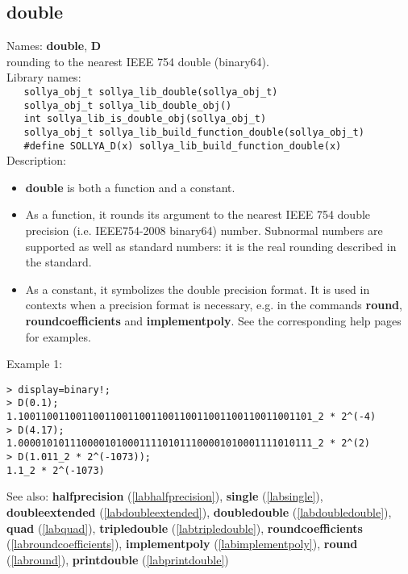\subsection{double}
\label{labdouble}
\noindent Names: \textbf{double}, \textbf{D}\\
\phantom{aaa}rounding to the nearest IEEE 754 double (binary64).\\[0.2cm]
\noindent Library names:\\
\verb|   sollya_obj_t sollya_lib_double(sollya_obj_t)|\\
\verb|   sollya_obj_t sollya_lib_double_obj()|\\
\verb|   int sollya_lib_is_double_obj(sollya_obj_t)|\\
\verb|   sollya_obj_t sollya_lib_build_function_double(sollya_obj_t)|\\
\verb|   #define SOLLYA_D(x) sollya_lib_build_function_double(x)|\\[0.2cm]
\noindent Description: \begin{itemize}

\item \textbf{double} is both a function and a constant.

\item As a function, it rounds its argument to the nearest IEEE 754 double precision (i.e. IEEE754-2008 binary64) number.
   Subnormal numbers are supported as well as standard numbers: it is the real
   rounding described in the standard.

\item As a constant, it symbolizes the double precision format. It is used in 
   contexts when a precision format is necessary, e.g. in the commands 
   \textbf{round}, \textbf{roundcoefficients} and \textbf{implementpoly}.
   See the corresponding help pages for examples.
\end{itemize}
\noindent Example 1: 
\begin{center}\begin{minipage}{15cm}\begin{Verbatim}[frame=single]
> display=binary!;
> D(0.1);
1.100110011001100110011001100110011001100110011001101_2 * 2^(-4)
> D(4.17);
1.000010101110000101000111101011100001010001111010111_2 * 2^(2)
> D(1.011_2 * 2^(-1073));
1.1_2 * 2^(-1073)
\end{Verbatim}
\end{minipage}\end{center}
See also: \textbf{halfprecision} (\ref{labhalfprecision}), \textbf{single} (\ref{labsingle}), \textbf{doubleextended} (\ref{labdoubleextended}), \textbf{doubledouble} (\ref{labdoubledouble}), \textbf{quad} (\ref{labquad}), \textbf{tripledouble} (\ref{labtripledouble}), \textbf{roundcoefficients} (\ref{labroundcoefficients}), \textbf{implementpoly} (\ref{labimplementpoly}), \textbf{round} (\ref{labround}), \textbf{printdouble} (\ref{labprintdouble})

